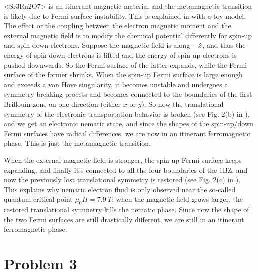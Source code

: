 \documentclass[hyperref, a4paper]{article}
\def\ce#1{<#1>}%
\begin{document}
\ce{Sr3Ru2O7} is an itinerant magnetic material 
and the metamagnetic transition 
is likely due to Fermi surface instability.
This is explained in \cite{kee2005itinerant} with a toy model.
The effect or the coupling between the electron magnetic moment 
and the external magnetic field 
is to modify the chemical potential differently for spin-up and spin-down electrons.
Suppose the magnetic field is along $-\vu*{z}$,
and thus the energy of spin-down electrons is lifted 
and the energy of spin-up electrons is pushed downwards.
So the Fermi surface of the latter expands, 
while the Fermi surface of the former shrinks.
When the spin-up Fermi surface is large enough
and exceeds a von Hove singularity, 
it becomes unstable and 
undergoes a symmetry breaking process 
and becomes connected to the boundaries of the first Brillouin zone 
on one direction (either $x$ or $y$).
So now the translational symmetry 
of the electronic transportation behavior 
is broken (see Fig. 2(b) in \cite{kee2005itinerant}), 
and we get an electronic nematic state,
and since the shapes of the spin-up/down Fermi surfaces 
have radical differences, 
we are now in an itinerant ferromagnetic phase. 
This is just the metamagnetic transition.

When the external magnetic field is stronger, 
the spin-up Fermi surface keeps expanding, 
and finally it's connected to all the four boundaries of the 1BZ, 
and now the previously lost translational symmetry is restored 
(see Fig. 2(c) in \cite{kee2005itinerant}).
This explains why nematic electron fluid 
is only observed near the so-called quantum critical point 
$\mu_0 H = \SI{7.9}{T}$:
when the magnetic field grows larger, 
the restored translational symmetry kills the nematic phase.
Since now the shape of the two Fermi surfaces are still drastically different, 
we are still in an itinerant ferromagnetic phase.


\section{Problem 3}

\subsection{}
\end{document}
